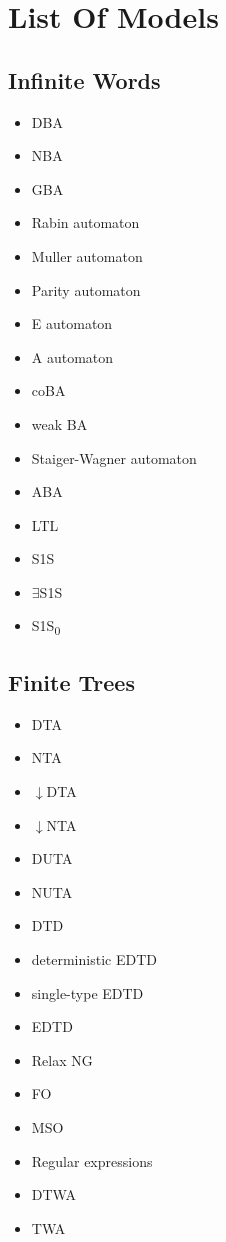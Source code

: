 \documentclass{article}
\begin{document}
\section{List Of Models}
\subsection{Infinite Words}
\begin{itemize}
	\item DBA
	\item NBA
	\item GBA
	\item Rabin automaton
	\item Muller automaton
	\item Parity automaton
	\item E automaton
	\item A automaton
	\item coBA
	\item weak BA
	\item Staiger-Wagner automaton
	\item ABA
	\item LTL
	\item S1S
	\item $\exists$S1S
	\item S1S\textsubscript{0}
\end{itemize}

\subsection{Finite Trees}
\begin{itemize}
	\item DTA
	\item NTA
	\item $\downarrow$DTA
	\item $\downarrow$NTA
	\item DUTA
	\item NUTA
	\item DTD
	\item deterministic EDTD
	\item single-type EDTD
	\item EDTD
	\item Relax NG
	\item FO
	\item MSO
	\item Regular expressions
	\item DTWA
	\item TWA
\end{itemize}
\end{document}
